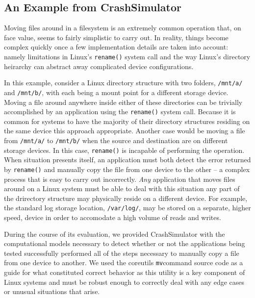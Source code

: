     \subsection{An Example from CrashSimulator}

    Moving files around in a filesystem is an extremely common operation that, on face value, seems to fairly simplistic
    to carry out.  In reality, things become complex quickly once a few implementation details are taken into account:
    namely limitations in Linux's {\tt rename()} system call and the way Linux's directory heirarchy can abstract away
    complicated device configurations.

    In this example, consider a Linux directory structure with two folders, {\tt /mnt/a/} and {\tt /mnt/b/}, with each
    being a mount point for a different storage device.  Moving a file around anywhere inside either of these
    directories can be trivially accomplished by an application using the {\tt rename()} system call.  Because it is
    common for systems to have the majority of their directory structures residing on the same device this approach
    appropriate.  Another case would be moving a file from {\tt /mnt/a/} to {\tt /mnt/b/} when the source and destination are on
    different storage devices.  In this case, {\tt rename()} is incapable of performing the operation.  When situation
    presents itself, an application must both detect the error returned by {\tt rename()} and manually copy the file from one
    device to the other -- a complex process that is easy to carry out incorrectly.  \emph{Any} application that moves
    files around on a Linux system must be able to deal with this situation any part of the drirectory structure may
    physically reside on a different device.  For example, the standard log storage location, {\tt /var/log/}, may be stored
    on a separate, higher speed, device in order to accomodate a high volume of reads and writes.

    During the course of its evaluation, we provided CrashSimulator with the computational models necessary to detect
    whether or not the applications being tested successfully performed all of the steps necessary to manually copy a
    file from one device to another.  We used the coreutils {\tt mv}command source code as a guide for what constituted
    correct behavior as this utility is a key component of Linux systems and must be robust enough to correctly deal
    with any edge cases or unusual situations that arise.

